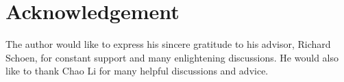 \documentclass[11pt]{amsart}
\theoremstyle{definition}
\begin{document}





	\section*{Acknowledgement}

The author would like to express his sincere gratitude to his advisor, Richard Schoen, for constant support and many enlightening discussions. He would also like to thank Chao Li for many helpful  discussions and advice.
\end{document}
